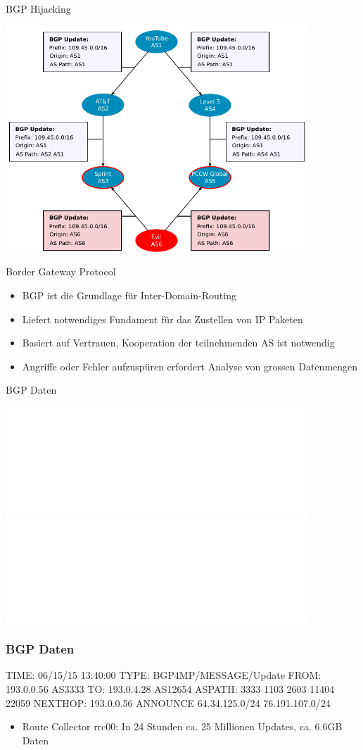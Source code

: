 \documentclass[9pt]{beamer}
\begin{document}
\begin{frame}{BGP Hijacking}{}
	\begin{center}
		\includegraphics[width=0.85\textwidth]{res/prefix_hijack.pdf}
	\end{center}
\end{frame}
\begin{frame}{Border Gateway Protocol}
    \begin{itemize}
        \pause
        \item{BGP ist die Grundlage für Inter-Domain-Routing}
        \pause
        \item{Liefert notwendiges Fundament für das Zustellen von IP Paketen}
        \pause
        \item{Basiert auf Vertrauen, Kooperation der teilnehmenden AS ist notwendig}
        \pause
        \item{Angriffe oder Fehler aufzuspüren erfordert Analyse von grossen Datenmengen}
    \end{itemize}
\end{frame}
\begin{frame}{BGP Daten}{}
	\begin{center}
        \includegraphics<1>[width=0.85\textwidth]{res/route_collector.pdf}
        \includegraphics<2>[width=0.85\textwidth]{res/route_collector2.pdf}
	\end{center}
\end{frame}
\begin{frame}[fragile]\frametitle{BGP Daten}
    \begin{semiverbatim}
        TIME: 06/15/15 13:40:00
        TYPE: BGP4MP/MESSAGE/Update
        FROM: 193.0.0.56 AS3333
        TO: 193.0.4.28 AS12654
        ASPATH: 3333 1103 2603 11404 22059
        NEXT\textunderscore HOP: 193.0.0.56
        ANNOUNCE
          64.34.125.0/24
            76.191.107.0/24
    \end{semiverbatim}
        \pause
        \begin{itemize}
            \item{Route Collector rrc00: In 24 Stunden ca. 25 Millionen Updates, ca. 6.6GB Daten}
        \end{itemize}
        \pause
\end{frame}
\end{document}
